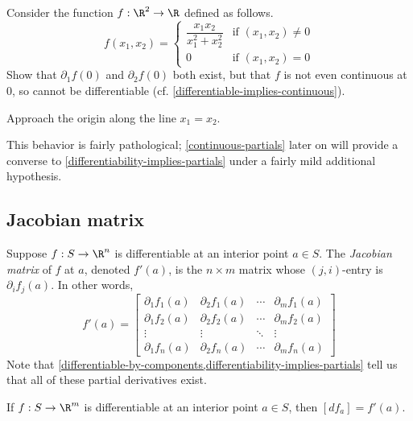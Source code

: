 \begin{exercise} \label{partials-dont-imply-differentiable}
	Consider the function $f : \R^2 \to \R$ defined as follows.
	\[ f(x_1, x_2) = \begin{cases} \dfrac{x_1 x_2}{x_1^2 + x_2^2} &  \text{if } (x_1, x_2) \neq 0 \\ 0 & \text{if } (x_1, x_2) = 0 \end{cases} \]
	Show that $\partial_1 f(0)$ and $\partial_2 f(0)$ both exist, but that $f$ is not even continuous at 0, so cannot be differentiable (cf.  \cref{differentiable-implies-continuous}). \begin{hint} Approach the origin along the line $x_1 = x_2$. \end{hint}
\end{exercise}

This behavior is fairly pathological; \cref{continuous-partials} later on will provide a converse to \cref{differentiability-implies-partials} under a fairly mild additional hypothesis. 

\subsection{Jacobian matrix}

\begin{definition}
	Suppose $f : S \to \R^n$ is differentiable at an interior point $a \in S$. The \emph{Jacobian matrix} of $f$ at $a$, denoted $f'(a)$, is the $n \times m$ matrix whose $(j, i)$-entry is $\partial_i f_j(a)$. In other words,
	\[ f'(a) = \begin{bmatrix} \partial_1 f_1(a) & \partial_2 f_1(a) & \dotsb & \partial_m f_1(a) \\ 
	\partial_1 f_2(a) & \partial_2 f_2(a) & \dotsb & \partial_m f_2(a) \\
	\vdots & \vdots & \ddots & \vdots \\ 
	\partial_1 f_n(a) & \partial_2 f_n(a) & \dotsb & \partial_m f_n(a) \end{bmatrix} \]
	Note that \cref{differentiable-by-components,differentiability-implies-partials} tell us that all of these partial derivatives exist. 
\end{definition}

\begin{theorem} \label{jacobian-matrix}
	If $f : S \to \R^m$ is differentiable at an interior point $a \in S$, then $[df_a] = f'(a)$. 
\end{theorem}

